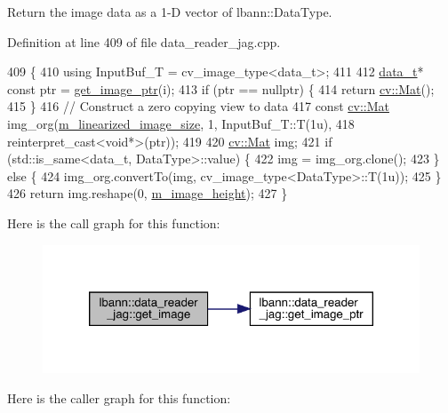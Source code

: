 Return the image data as a 1-\/D vector of lbann\+::\+Data\+Type. 



Definition at line 409 of file data\+\_\+reader\+\_\+jag.\+cpp.


\begin{DoxyCode}
409                                                      \{
410   \textcolor{keyword}{using} InputBuf\_T = cv\_image\_type<data\_t>;
411   
412   \hyperlink{classlbann_1_1data__reader__jag_a7377d6c02c455f019a378489b9b8eab4}{data\_t}* \textcolor{keyword}{const} ptr = \hyperlink{classlbann_1_1data__reader__jag_aab51581a1b8175bf5da1b74454ef7701}{get\_image\_ptr}(i);
413   \textcolor{keywordflow}{if} (ptr == \textcolor{keyword}{nullptr}) \{
414     \textcolor{keywordflow}{return} \hyperlink{base_8hpp_a68f11fdc31b62516cb310831bbe54d73}{cv::Mat}();
415   \}
416   \textcolor{comment}{// Construct a zero copying view to data}
417   \textcolor{keyword}{const} \hyperlink{base_8hpp_a68f11fdc31b62516cb310831bbe54d73}{cv::Mat} img\_org(\hyperlink{classlbann_1_1data__reader__jag_a7c2aa5f489e7c7a3236c1f6c4a760048}{m\_linearized\_image\_size}, 1, InputBuf\_T::T(1u),
418                         reinterpret\_cast<void*>(ptr));
419 
420   \hyperlink{base_8hpp_a68f11fdc31b62516cb310831bbe54d73}{cv::Mat} img;
421   \textcolor{keywordflow}{if} (std::is\_same<data\_t, DataType>::value) \{
422     img = img\_org.clone();
423   \} \textcolor{keywordflow}{else} \{
424     img\_org.convertTo(img, cv\_image\_type<DataType>::T(1u));
425   \}
426   \textcolor{keywordflow}{return} img.reshape(0, \hyperlink{classlbann_1_1data__reader__jag_a6178d5dffd5e9bf7cf5703613cf9bd2e}{m\_image\_height});
427 \}
\end{DoxyCode}
Here is the call graph for this function\+:\nopagebreak
\begin{figure}[H]
\begin{center}
\leavevmode
\includegraphics[width=320pt]{classlbann_1_1data__reader__jag_aee6e15cf6eda3bc97d1f7b077d74747a_cgraph}
\end{center}
\end{figure}
Here is the caller graph for this function\+:\nopagebreak
